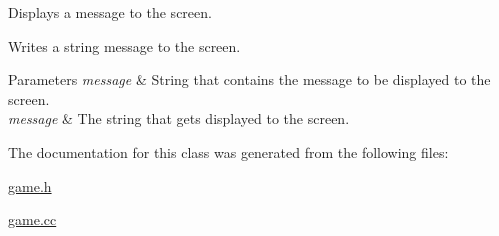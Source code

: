 Displays a message to the screen. 

Writes a string message to the screen.


\begin{DoxyParams}{Parameters}
{\em message} & String that contains the message to be displayed to the screen.\\
\hline
{\em message} & The string that gets displayed to the screen. \\
\hline
\end{DoxyParams}


The documentation for this class was generated from the following files\+:\begin{DoxyCompactItemize}
\item 
\hyperlink{game_8h}{game.\+h}\item 
\hyperlink{game_8cc}{game.\+cc}\end{DoxyCompactItemize}
